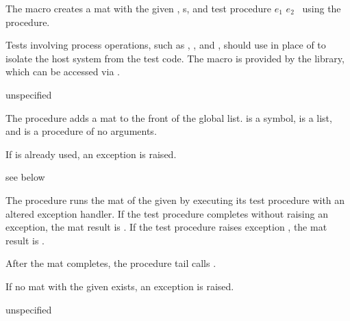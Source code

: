 The  macro creates a mat with the given ,
s, and test procedure $e_1$ $e_2$ \etc\ using the
 procedure.

\begin{syntax}
\end{syntax}
\expandsto{}

Tests involving process operations, such as , , and
, should use  in place of 
to isolate the host system from the test code.
The  macro is provided by the  library,
which can be accessed via .

\begin{procedure}
\end{procedure}
\returns{} unspecified

The  procedure adds a mat to the front of the global
list.  is a symbol,  is a list, and  is
a procedure of no arguments.

If  is already used, an exception is raised.

\begin{procedure}
\end{procedure}
\returns{} see below

The  procedure runs the mat of the given  by
executing its test procedure with an altered exception handler. If the
test procedure completes without raising an exception, the mat result
is . If the test procedure raises exception , the
mat result is .

After the mat completes, the  procedure tail calls
.

If no mat with the given  exists, an exception is raised.

\begin{syntax}
\end{syntax}
\returns{} unspecified

